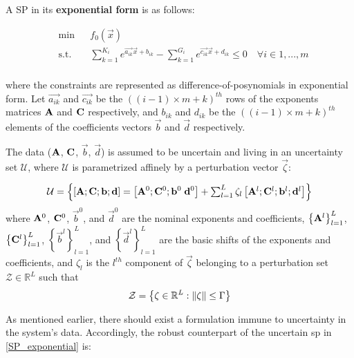 A SP in its \textbf{exponential form} is as follows:

\begin{equation}
    \label{SP_exponential}
\begin{aligned}
	& \min && f_0\left(\vec{x}\right) \\
	& \text{s.t.} && \textstyle{\sum}_{k=1}^{K_i}e^{\vec{a_{ik}}\vec{x} + b_{ik}} - \textstyle{\sum}_{k=1}^{G_i}e^{\vec{c_{ik}}\vec{x} + d_{ik}} \leq 0 \quad \forall i \in 1,...,m\\
\end{aligned}
\end{equation}

where the constraints are represented as difference-of-posynomials in exponential form.
Let $\vec{a_{ik}}$ and $\vec{c_{ik}}$ be the $((i-1)\times m + k)^{th}$ rows of the exponents matrices
$\mathbf{A}$ and $\mathbf{C}$ respectively, and $b_{ik}$ and $d_{ik}$ be the $((i-1)\times m + k)^{th}$ elements
of the coefficients vectors $\vec{b}$ and $\vec{d}$ respectively.

The data ($\mathbf{A}$, $\mathbf{C}$, $\vec{b}$, $\vec{d}$) is assumed to be uncertain and
living in an uncertainty set $\mathcal{U}$, where $\mathcal{U}$ is parametrized
affinely by a perturbation vector $\vec{\zeta}$:

\begin{equation}
\mathcal{U} = \left\{\left[\mathbf{A};\mathbf{C};\mathbf{b};\mathbf{d}\right] = \left[\mathbf{A}^0;\mathbf{C}^0;\mathbf{b}^0\;\mathbf{d}^0 \right] + \textstyle{\sum_{l=1}^{L}\zeta_l\left[\mathbf{A}^l;\mathbf{C}^l;\mathbf{b}^l; \mathbf{d}^l\right]}\right\}
\label{Data}
\end{equation}
where $\mathbf{A}^0$, $\mathbf{C}^0$, $\vec{b}^0$, and $\vec{d}^0$ are the nominal exponents and coefficients, $\left\{\mathbf{A}^l\right\}_{l=1}^{L}$, $\left\{\mathbf{C}^l\right\}_{l=1}^{L}$, $\left\{\vec{b}^l\right\}_{l=1}^{L}$, and $\left\{\vec{d}^l\right\}_{l=1}^{L}$ are the basic shifts of the exponents and coefficients, and $\zeta_l$ is the $l^{th}$ component of $\vec{\zeta}$ belonging to a perturbation set $\mathcal{Z} \in \mathbb{R}^L$ such that
\begin{equation}
\mathcal{Z} = \left\{ \mathbf{\zeta} \in \mathbb{R}^L: \left\lVert\mathbf{\zeta}\right\rVert \leq \Gamma \right\}
\label{perturbation_set}
\end{equation}

As mentioned earlier, there should exist a formulation immune to
uncertainty in the system's data. Accordingly, the robust counterpart
of the uncertain \gls{sp} in \eqref{SP_exponential} is:

